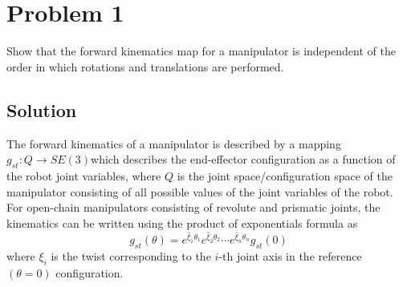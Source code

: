 \section*{Problem 1}
\setcounter{section}{1}
\setcounter{equation}{0}

Show that the forward kinematics map for a manipulator is independent of the order in which rotations and translations are performed.

\subsection*{Solution}

The forward kinematics of a manipulator is described by a mapping \( g_{st} : Q \to SE (3) \)which describes the end-eﬀector configuration as a function of the robot joint variables, where \( Q \) is the joint space/configuration space of the manipulator consisting of all possible values of the joint variables of the robot.
For open-chain manipulators consisting of revolute and prismatic joints, the kinematics can be written using the product of exponentials formula as
\begin{equation}
    g_{st}(\theta)
    =
    e^{\widehat{\xi}_1 \theta_1}
    e^{\widehat{\xi}_2 \theta_2}
    \cdots
    e^{\widehat{\xi}_n \theta_n}
    g_{st}(0)
\end{equation}
where \( \xi_{i} \) is the twist corresponding to the \(i\)-th joint axis in the reference \( (\theta = 0) \) conﬁguration.
